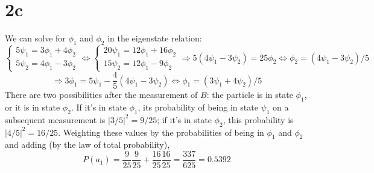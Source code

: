 \documentclass{article}
\begin{document}
\section*{2c}
We can solve for $\phi_{1}$ and $\phi_{2}$ in the eigenstate relation:
\[
  \begin{cases}
    5\psi_{1}=3\phi_{1}+4\phi_{2} \\
    5\psi_{2}=4\phi_{1}-3\phi_{2}
  \end{cases}
  \Leftrightarrow
  \begin{cases}
    20\psi_{1}=12\phi_{1}+16\phi_{2} \\
    15\psi_{2}=12\phi_{1}-9\phi_{2}
  \end{cases}
  \Rightarrow
  5(4\psi_{1}-3\psi_{2})=25\phi_{2}
  \Leftrightarrow
  \phi_{2}=(4\psi_{1}-3\psi_{2})/5
\]
\[
  \Rightarrow
  3\phi_{1}=5\psi_{1}-\frac{4}{5}(4\psi_{1}-3\psi_{2})
  \Leftrightarrow
  \phi_{1}=({3}\psi_{1}+{4}\psi_{2})/5
\]
There are two possibilities after the measurement of $B$: the particle is in state $\phi_{1}$, or it is in state $\phi_{2}$.
If it's in state $\phi_{1}$, its probability of being in state $\psi_{1}$ on a subsequent measurement is $|3/5|^{2}=9/25$;
if it's in state $\phi_{2}$, this probability is $|4/5|^{2}=16/25$.
Weighting these values by the probabilities of being in $\phi_{1}$ and $\phi_{2}$ and adding (by the law of total probability),
\[P(a_{1})=\frac{9}{25}\frac{9}{25}+\frac{16}{25}\frac{16}{25}=\frac{337}{625}=0.5392\]
\end{document}
